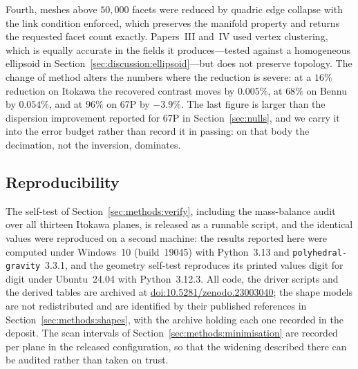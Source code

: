 Fourth, meshes above $50{,}000$ facets were reduced by quadric edge
collapse with the link condition enforced, which preserves the manifold
property and returns the requested facet count exactly. Papers~III
and~IV used vertex clustering, which is equally accurate in the fields it
produces---tested against a homogeneous ellipsoid in
Section~\ref{sec:discussion:ellipsoid}---but does not preserve topology.
The change of method alters the numbers where the reduction is severe: at
a $16\%$ reduction on Itokawa the recovered contrast moves by $0.005\%$,
at $68\%$ on Bennu by $0.054\%$, and at $96\%$ on 67P by $-3.9\%$. The
last figure is larger than the dispersion improvement reported for 67P in
Section~\ref{sec:nulls}, and we carry it into the error budget rather
than record it in passing: on that body the decimation, not the
inversion, dominates.

\subsection{Reproducibility}
\label{sec:methods:repro}

The self-test of Section~\ref{sec:methods:verify}, including the
mass-balance audit over all thirteen Itokawa planes, is released as a
runnable script, and the identical values were reproduced on a second
machine: the results reported here were computed under Windows~10
(build~19045) with Python~3.13 and \texttt{polyhedral-gravity}~3.3.1, and
the geometry self-test reproduces its printed values digit for digit under
Ubuntu~24.04 with Python~3.12.3. All code, the driver
scripts and the derived tables are archived at
\href{https://doi.org/10.5281/zenodo.23003040}{doi:10.5281/zenodo.23003040};
the shape
models are not redistributed and are identified by their published
references in Section~\ref{sec:methods:shapes}, with the archive holding
each one recorded in the deposit. The scan intervals of
Section~\ref{sec:methods:minimisation} are recorded per plane in the
released configuration, so that the widening described there can be
audited rather than taken on trust.
